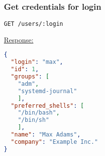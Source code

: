 %
%
%
%
%
%
%


\subsubsection{Get credentials for login}

\begin{lstlisting}[language=http_request]
GET /users/:login
\end{lstlisting}


{\tiny \underline{Response:}}
\begin{lstlisting}[language=json, numbers=none]
{
  "login": "max",
  "id": 1,
  "groups": [
    "adm",
    "systemd-journal"
    ],
  "preferred_shells": [
    "/bin/bash",
    "/bin/sh"
    ],
  "name": "Max Adams",
  "company": "Example Inc."
}
\end{lstlisting}
